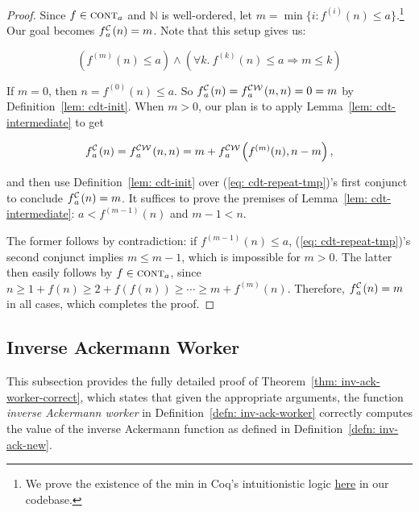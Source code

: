 \begin{proof}
	Since $f\in \text{\scshape{cont}}_{a}$ and $\mathbb{N}$ is well-ordered, 
	let $m = \min\big\{i : f^{(i)}(n)\le a\big\}$.\footnote{We prove the existence 
		of the min in Coq’s intuitionistic logic \href{https://github.com/inv-ack/inv-ack/blob/6099297c6ab0e16d14b037fb5ed600c4d22818f6/countdown.v\#L125-L150}{here} in our codebase.} Our goal becomes 
	$\cdt{f}{a}(n) = m$. Note that this setup gives us: 
	
	\begin{equation} \label{eq: cdt-repeat-tmp}
	\left(f^{(m)}(n) \le a\right) \wedge
	\left(\forall k.~f^{(k)}(n)\le a \Rightarrow m \le k\right)
	\end{equation}
	
	If $m = 0$, then $n = f^{(0)}(n)\le a$. So $\cdt{f}{a}(n) = \cdw{f}{a}(n, n) = 0 = m$ by Definition~\ref{lem: cdt-init}.
	When $m > 0$, our plan is to apply Lemma~\ref{lem: cdt-intermediate} to get
	
	\begin{equation*}
	\cdt{f}{a}(n) = \cdw{f}{a}(n, n) = m + \cdw{f}{a}\left(f^{(m)}(n), n-m\right),
	\end{equation*}
	
	and then use Definition~\ref{lem: cdt-init} over (\ref{eq: cdt-repeat-tmp})'s first conjunct to conclude $\cdt{f}{a}(n) = m$. It suffices to prove the premises of Lemma~\ref{lem: cdt-intermediate}: $a < f^{(m-1)}(n)$ and $m-1 < n$.
	
	The former follows by contradiction: if $f^{(m-1)}(n) \le a$, (\ref{eq: cdt-repeat-tmp})'s second conjunct implies $m\le m-1$, which is impossible for $m > 0$. The latter then easily follows by $f\in \text{\scshape{cont}}_{a}$, since
	$n \ge 1 + f(n) \ge 2 + f(f(n)) \ge \cdots \ge m + f^{(m)}(n)$.
	\linebreak Therefore, $\cdt{f}{a}(n) = m$ in all cases, which completes the proof.
\end{proof}

\subsection{Inverse Ackermann Worker}
\label{apx:proof_correct_inv_ack_worker}
This subsection provides the fully detailed proof of Theorem~\ref{thm: inv-ack-worker-correct}, which states that given the appropriate arguments, the function \emph{inverse Ackermann worker} in Definition~\ref{defn: inv-ack-worker} correctly computes the value of the inverse Ackermann function as defined in Definition~\ref{defn: inv-ack-new}.

